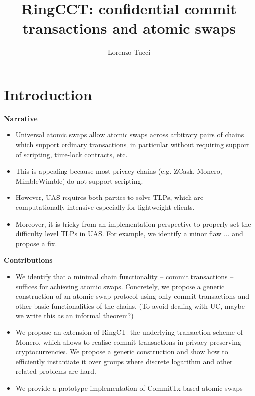 \documentclass{article}      	%
\begin{document}
         
\author{Lorenzo Tucci}
\title{RingCCT: confidential commit transactions and atomic swaps}

\maketitle

\tableofcontents
\newpage

\section{Introduction}
\begin{todobox}
\textbf{Narrative}
\begin{itemize}
\item Universal atomic swaps allow atomic swaps across arbitrary pairs of chains which support ordinary transactions, in particular without requiring support of scripting, time-lock contracts, etc.
\item This is appealing because most privacy chains (e.g. ZCash, Monero, MimbleWimble) do not support scripting.
\item However, UAS requires both parties to solve TLPs, which are computationally intensive especially for lightweight clients.
\item Moreover, it is tricky from an implementation perspective to properly set the difficulty level TLPs in UAS. For example, we identify a minor flaw ... and propose a fix.
\end{itemize}

\textbf{Contributions}
\begin{itemize}
\item We identify that a minimal chain functionality -- commit transactions -- suffices for achieving atomic swaps. Concretely, we propose a generic construction of an atomic swap protocol using only commit transactions and other basic functionalities of the chains. (To avoid dealing with UC, maybe we write this as an informal theorem?)
\item We propose an extension of RingCT, the underlying transaction scheme of Monero, which allows to realise commit transactions in privacy-preserving cryptocurrencies. We propose a generic construction and show how to efficiently instantiate it over groups where discrete logarithm and other related problems are hard. 
\item We provide a prototype implementation of CommitTx-based atomic swaps
\end{itemize}


\end{todobox}
\end{document}
